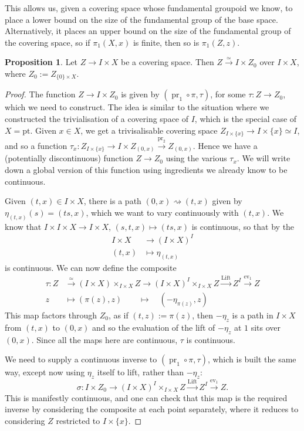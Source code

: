 \documentclass{tufte-handout}
\def\pt {\mathrm{pt}}
\DeclareMathOperator{\pr}{pr}
\DeclareMathOperator{\ev}{ev}
\DeclareMathOperator{\Lift}{Lift}
\theoremstyle{definition}
\newtheorem{prop}{Proposition}
\begin{document}
This allows us, given a covering space whose fundamental groupoid we know, to place a 
lower bound on the size of the fundamental group of the base space. Alternatively, it 
places an upper bound on the size of the fundamental group of the covering space, so if 
$\pi_1(X,x)$ is finite, then so is $\pi_1(Z,z)$.

\begin{prop}\label{prop:cov_space_of_IxX}
Let $Z\to I\times X$ be a covering space. Then $Z\xrightarrow{\simeq} I\times Z_0$ over 
$I\times X$, where $Z_0 := Z_{\{0\}\times X}$.
\end{prop}

\begin{proof}
The function $Z\to I\times Z_0$ is given by $(\pr_1\circ \pi,\tau)$, for some 
$\tau\colon Z\to Z_0$, which we need to construct.
The idea is similar to the situation where we constructed the trivialisation of a 
covering space of $I$, which is the special case of $X=\pt$. 
Given $x\in X$, we get a trivisalisable covering space $Z_{I\times \{x\}}\to I\times \{x\}\simeq I$, and so 
a function $\tau_x\colon Z_{I\times \{x\}} \to I\times Z_{(0,x)} \xrightarrow{\pr_2}Z_{(0,x)}$. 
Hence we have a (potentially discontinuous) function $Z \to Z_0$ using the various $\tau_x$. 
We will write down a global version of this function using ingredients we already know to be 
continuous.

Given $(t,x)\in I\times X$, there is a path $(0,x) \rightsquigarrow (t,x)$ given by
$\eta_{(t,x)}(s) = (ts,x)$, which we want to vary continuously with $(t,x)$. We know that 
$I\times I \times X\to I\times X$, $(s,t,x) \mapsto (ts,x)$ is continuous, so that by the 
\begin{align*}
	I\times X & \to (I\times X)^I\\
	(t,x) & \mapsto \eta_{(t,x)}
\end{align*}
is continuous. We can now define the composite
\begin{align*}
	\tau\colon Z & \xrightarrow{\simeq} (I\times X)\times_{I\times X} Z \to (I\times X)^I \times_{I\times X} Z 
	\xrightarrow{\Lift} Z^I\xrightarrow{\ev_1} Z\\
	z&\mapsto (\pi(z),z)\qquad \mapsto\quad (-\eta_{\pi(z)},z)
\end{align*}
This map factors through $Z_0$, as if $(t,z) :=\pi(z)$, then $-\eta_z$ is a path in $I\times X$ 
from $(t,x)$ to $(0,x)$ and so the evaluation of the lift of $-\eta_z$ at $1$ sits over $(0,x)$.
Since all the maps here are continuous, $\tau$ is continuous.

We need to supply a continuous inverse to $(\pr_1\circ \pi,\tau)$, which is built the 
same way, except now using $\eta_z$ itself to lift, rather than $-\eta_z$:
\[
	\sigma\colon I\times Z_0 \to (I\times X)^I\times_{I\times X} Z \xrightarrow{\Lift}
	Z^I \xrightarrow{\ev_1} Z.
\]
This is manifestly continuous, and one can check that this map is the required inverse by
considering the composite at each point separately, where it reduces to considering $Z$ 
restricted to $I\times \{x\}$.
\end{proof}
\end{document}

